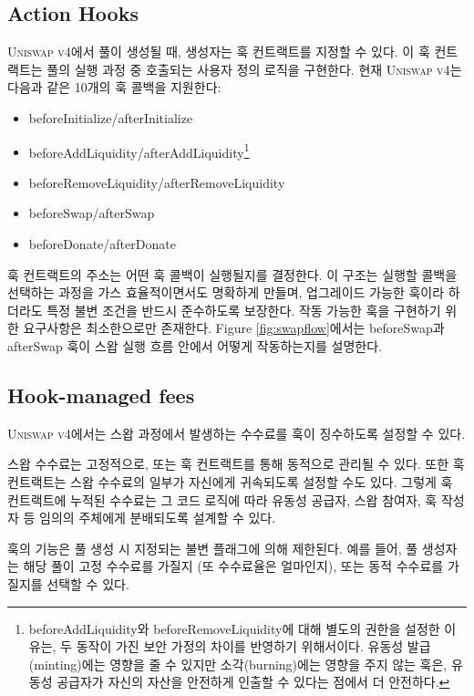 \documentclass[sigconf,nonacm,prologue,table]{acmart}
\numberwithin{equation}{section}
\theoremstyle{definition}
\theoremstyle{remark}
\begin{document}
\subsection{Action Hooks} 
\label{actionhooks}

\textsc{Uniswap v4}에서 풀이 생성될 때, 생성자는 훅 컨트랙트를 지정할 수 있다. 이 훅 컨트랙트는 풀의 실행 과정 중 호출되는 사용자 정의 로직을 구현한다.
현재 \textsc{Uniswap v4}는 다음과 같은 10개의 훅 콜백을 지원한다:

\begin{itemize}
\item beforeInitialize/afterInitialize
\item beforeAddLiquidity/afterAddLiquidity\footnote{beforeAddLiquidity와 beforeRemoveLiquidity에 대해 별도의 권한을 설정한 이유는, 두 동작이 가진 보안 가정의 차이를 반영하기 위해서이다. 유동성 발급(minting)에는 영향을 줄 수 있지만 소각(burning)에는 영향을 주지 않는 훅은, 유동성 공급자가 자신의 자산을 안전하게 인출할 수 있다는 점에서 더 안전하다.}
\item beforeRemoveLiquidity/afterRemoveLiquidity
\item beforeSwap/afterSwap
\item beforeDonate/afterDonate
\end{itemize}

훅 컨트랙트의 주소는 어떤 훅 콜백이 실행될지를 결정한다. 이 구조는 실행할 콜백을 선택하는 과정을 가스 효율적이면서도 명확하게 만들며, 업그레이드 가능한 훅이라 하더라도 특정 불변 조건을 반드시 준수하도록 보장한다. 작동 가능한 훅을 구현하기 위한 요구사항은 최소한으로만 존재한다. Figure \ref{fig:swapflow}에서는 beforeSwap과 afterSwap 훅이 스왑 실행 흐름 안에서 어떻게 작동하는지를 설명한다.


\subsection{Hook-managed fees} \label{hookfees}

\textsc{Uniswap v4}에서는 스왑 과정에서 발생하는 수수료를 훅이 징수하도록 설정할 수 있다.

스왑 수수료는 고정적으로, 또는 훅 컨트랙트를 통해 동적으로 관리될 수 있다. 또한 훅 컨트랙트는 스왑 수수료의 일부가 자신에게 귀속되도록 설정할 수도 있다. 그렇게 훅 컨트랙트에 누적된 수수료는 그 코드 로직에 따라 유동성 공급자, 스왑 참여자, 훅 작성자 등 임의의 주체에게 분배되도록 설계할 수 있다.

훅의 기능은 풀 생성 시 지정되는 불변 플래그에 의해 제한된다. 예를 들어, 풀 생성자는 해당 풀이 고정 수수료를 가질지 (또 수수료율은 얼마인지), 또는 동적 수수료를 가질지를 선택할 수 있다.
\end{document}
